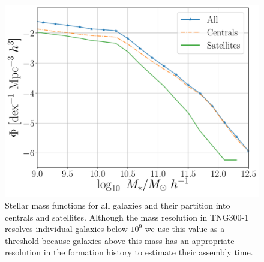 \documentclass{aa}
\begin{document}
\begin{figure}
    \centering
    \includegraphics[width=1\columnwidth]{figuras/Histogramas.pdf}
    \caption{Stellar mass functions for all galaxies and their partition
      into centrals and satellites. 
    Although the mass resolution in TNG300-1 resolves individual
    galaxies below $10^{9}$ \Msunh we use this value as a threshold
    because galaxies above this mass has an appropriate resolution in
    the formation history to estimate their assembly time.}
    \label{fig:stellar_fuction}
\end{figure}
\end{document}
